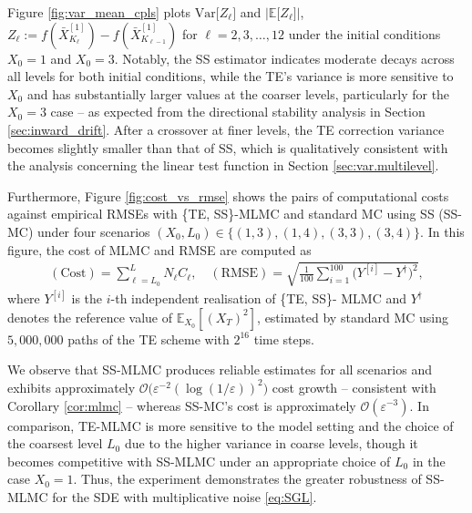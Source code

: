 \documentclass[11pt]{article}
\begin{document}
Figure \ref{fig:var_mean_cpls} plots $\mathrm{Var} \bigl[Z_\ell \bigr]$ and $| \mathbb{E} \bigl[Z_\ell \bigr] |$, $Z_\ell := f (\bar{X}^{[1]}_{K_{\ell}}) - f (\bar{X}^{[1]}_{K_{\ell-1}})$ for $\ell = 2, 3, \ldots, 12$ under the initial conditions $X_0 = 1$ and $X_0 = 3$. Notably, the SS estimator indicates moderate decays across all levels for both initial conditions, while the TE's variance is more sensitive to $X_0$ and has substantially larger values at the coarser levels, particularly for the $X_0 = 3$ case -- as expected from the directional stability analysis in Section \ref{sec:inward_drift}. After a crossover at finer levels, the TE correction variance becomes slightly smaller than that of SS, which is qualitatively consistent with the analysis concerning the linear test function in Section \ref{sec:var.multilevel}. 

Furthermore, Figure \ref{fig:cost_vs_rmse} shows the pairs of computational costs against empirical RMSEs with \{TE, SS\}-MLMC and standard MC using SS (SS-MC) under four scenarios $(X_0, L_0) \in \{ (1, 3), (1, 4), (3, 3), (3,4) \}$. In this figure, the cost of MLMC and RMSE are computed as
\begin{align*} 
(\mathrm{Cost}) = \sum_{\ell = L_0}^{L} N_\ell C_\ell, \quad 
(\mathrm{RMSE}) = \sqrt{\tfrac{1}{100} \sum_{i = 1}^{100} \bigl( Y^{[i]} - Y^\dagger \bigr)^2 },
\end{align*} 
where $Y^{[i]}$ is the $i$-th independent realisation of \{TE, SS\}- MLMC and $Y^\dagger$ denotes the reference value of $\mathbb{E}_{X_0} [(X_T)^2]$, estimated by standard MC using $5,000,000$ paths of the TE scheme with $2^{16}$ time steps. 

We observe that SS-MLMC produces reliable estimates for all scenarios and exhibits approximately $\mathcal{O}\bigl(\varepsilon^{-2} (\log (1/\varepsilon))^2 \bigr)$ cost growth -- consistent with Corollary \ref{cor:mlmc} -- whereas SS-MC's cost is approximately $\mathcal{O} (\varepsilon^{-3})$. In comparison, TE-MLMC is more sensitive to the model setting and the choice of the coarsest level $L_0$ due to the higher variance in coarse levels, though it becomes competitive with SS-MLMC under an appropriate choice of $L_0$ in the case $X_0 = 1$. Thus, the experiment demonstrates the greater robustness of SS-MLMC for the SDE with multiplicative noise \eqref{eq:SGL}. 



\end{document}
